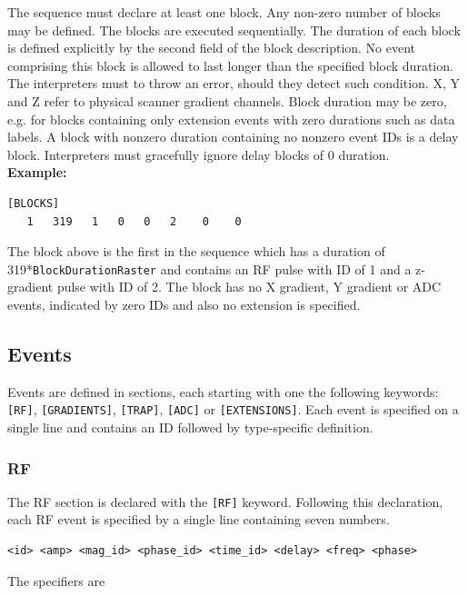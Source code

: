 \documentclass{article}
\begin{document}
\begin{minipage}{\textwidth}
The sequence must declare at least one block. Any non-zero number of blocks may be defined. The blocks are executed sequentially. The duration of each block is defined explicitly by the second field of the block description. No event comprising this block is allowed to last longer than the specified block duration. The interpreters must to throw an error, should they detect such condition. X, Y and Z refer to physical scanner gradient channels. Block duration may be zero, e.g. for blocks containing only extension events with zero durations such as data labels. A block with nonzero duration containing no nonzero event IDs is a delay block. Interpreters must gracefully ignore delay blocks of 0 duration. \\

\textbf{Example:}
\begin{lstlisting}
[BLOCKS]
   1   319   1   0   0   2    0    0
\end{lstlisting}
\end{minipage}

The block above is the first in the sequence which has a duration of 319*\verb.BlockDurationRaster. and contains an RF pulse with ID of 1 and a z-gradient pulse with ID of 2. The block has no X gradient, Y gradient or ADC events, indicated by zero IDs and also no extension is specified.

\subsection{Events}

Events are defined in sections, each starting with one the following keywords: \verb.[RF]., \verb.[GRADIENTS]., \verb.[TRAP]., \verb.[ADC]. or \verb.[EXTENSIONS].. Each event is specified on a single line and contains an ID followed by type-specific definition.

\subsubsection{RF}
The RF section is declared with the \verb.[RF]. keyword. Following this declaration, each RF event is specified by a single line containing seven numbers.
\begin{lstlisting}
<id> <amp> <mag_id> <phase_id> <time_id> <delay> <freq> <phase>
\end{lstlisting}

The specifiers are
\end{document}
